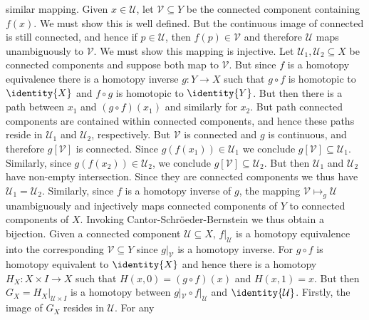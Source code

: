 \documentclass{book}                                                           %
\begin{document}
\begin{solution}
            similar mapping. Given $x\in\mathcal{U}$, let $\mathcal{V}\subseteq{Y}$
            be the connected component containing $f(x)$. We must show this is well
            defined. But the continuous image of connected is still connected, and
            hence if $p\in\mathcal{U}$, then $f(p)\in\mathcal{V}$ and therefore
            $\mathcal{U}$ maps unambiguously to $\mathcal{V}$. We must show this
            mapping is injective. Let $\mathcal{U}_{1},\mathcal{U}_{2}\subseteq{X}$
            be connected components and suppose both map to $\mathcal{V}$. But since
            $f$ is a homotopy equivalence there is a homotopy inverse
            $g:Y\rightarrow{X}$ such that $g\circ{f}$ is homotopic to $\identity{X}$
            and $f\circ{g}$ is homotopic to $\identity{Y}$. But then there is a path
            between $x_{1}$ and $(g\circ{f})(x_{1})$ and similarly for $x_{2}$. But
            path connected components are contained within connected components, and
            hence these paths reside in $\mathcal{U}_{1}$ and $\mathcal{U}_{2}$,
            respectively. But $\mathcal{V}$ is connected and $g$ is continuous, and
            therefore $g[\mathcal{V}]$ is connected. Since
            $g(f(x_{1}))\in\mathcal{U}_{1}$ we conclude
            $g[\mathcal{V}]\subseteq\mathcal{U}_{1}$. Similarly, since
            $g(f(x_{2}))\in\mathcal{U}_{2}$, we conclude
            $g[\mathcal{V}]\subseteq\mathcal{U}_{2}$. But then $\mathcal{U}_{1}$ and
            $\mathcal{U}_{2}$ have non-empty intersection. Since they are connected
            components we thus have $\mathcal{U}_{1}=\mathcal{U}_{2}$. Similarly,
            since $f$ is a homotopy inverse of $g$, the mapping
            $\mathcal{V}\mapsto_{g}\mathcal{U}$ unambiguously and injectively maps 
            connected components of $Y$ to connected components of $X$. Invoking
            Cantor-Schr\"{o}eder-Bernstein we thus obtain a bijection. Given
            a connected component $\mathcal{U}\subseteq{X}$, $f|_{\mathcal{U}}$ is a
            homotopy equivalence into the corresponding $\mathcal{V}\subseteq{Y}$
            since $g|_{\mathcal{V}}$ is a homotopy inverse. For $g\circ{f}$ is
            homotopy equivalent to $\identity{X}$ and hence there is a homotopy
            $H_{X}:X\times{I}\rightarrow{X}$ such that
            $H(x,0)=(g\circ{f})(x)$ and $H(x,1)=x$. But then
            $G_{X}=H_{X}|_{\mathcal{U}\times{I}}$ is a homotopy between
            $g|_{\mathcal{V}}\circ{f}|_{\mathcal{U}}$ and $\identity{\mathcal{U}}$.
            Firstly, the image of $G_{X}$ resides in $\mathcal{U}$. For any

\end{solution}
\end{document}
